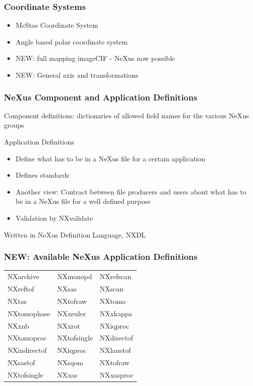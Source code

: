 \documentclass{beamer}
\newcommand{\changefont}[3] {
 \fontfamily{#1} \fontseries{#2} \fontshape{#3} \selectfont}
\begin{document}
\begin{frame} \frametitle{Coordinate Systems}
\begin{itemize}
\item McStas Coordinate System
\item Angle based polar coordinate system
\item {\color{red}NEW: full mapping imageCIF - NeXus now possible}
\item {\color{red}NEW: General axis and transformations}
\end{itemize}
\end{frame}



\begin{frame} \frametitle{NeXus Component and Application Definitions }
\begin{itemize}
\item Component definitions: 
 dictionaries of allowed field names for the various NeXus groups
{\changefont{cmr}{bx}{sc} 
\item Application Definitions
\begin{itemize}
\item Define what has to be in a NeXus file for a certain application
\item Defines standards
\item Another view: Contract between file producers and users about what has to be in 
 a NeXus file for a well defined purpose 
\item Validation by NXvalidate
\end{itemize}
}
\item Written in NeXus Definition Language, NXDL
\end{itemize}
\end{frame}

\begin{frame} \frametitle{{\color{red}NEW}: Available NeXus Application Definitions}
{\changefont{cmr}{bx}{sc} 
\begin{tabular}{lll}
NXarchive& NXmonopd & NXrefscan \\
NXreftof & NXsas & NXscan \\
NXtas & NXtofraw& NXtomo\\
NXtomophase & NXxeuler & NXxkappa\\
NXxnb & NXxrot & NXiqproc \\
NXtomoproc & NXtofsingle& NXdirectof\\
NXindirectof & NXiqproc& NXlauetof\\
NXsastof& NXsqom& NXtofraw\\
NXtofsingle& NXxas& NXxasproc\\
\end{tabular}
}
\end{frame}
\end{document}
